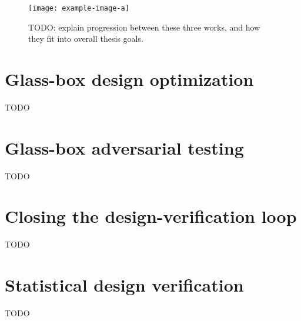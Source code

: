 \begin{figure}[h]
    \centering
    \texttt{[image: example-image-a]}
    \caption{TODO: explain progression between these three works, and how they fit into overall thesis goals.}
    \label{ch8:fig:progression}
\end{figure}

\section{Glass-box design optimization}\label{ch8:sec:design}

TODO

\section{Glass-box adversarial testing}\label{ch8:sec:adversarial}

TODO

\section{Closing the design-verification loop}\label{ch8:sec:game}

TODO

\section{Statistical design verification}\label{ch8:sec:statistical_checking}

TODO
